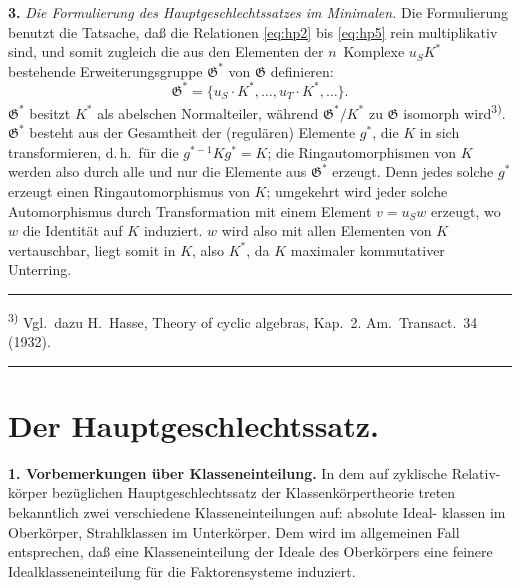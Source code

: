 \documentclass[12pt,a4paper]{article}
\theoremstyle{plain}
\newcommand{\Ga}{\mathfrak{G}}
\begin{document}
\medskip
\noindent\textbf{3.}\hspace{0.5em}%
\emph{Die Formulierung des Hauptgeschlechtssatzes im Minimalen.}\hspace{0.5em}%
Die Formulierung benutzt die Tatsache, da\ss{} die Relationen \eqref{eq:hp2} bis \eqref{eq:hp5} rein
multiplikativ sind, und somit zugleich die aus den Elementen der $n$~Komplexe
$u_S K^*$ bestehende Erweiterungsgruppe $\Ga^*$ von $\Ga$ definieren:
\begin{equation}\label{eq:hp6}
\Ga^* = \{u_S \cdot K^*, \ldots, u_T \cdot K^*, \ldots\}.
\end{equation}
$\Ga^*$ besitzt $K^*$ als abelschen Normalteiler, w\"ahrend $\Ga^*/K^*$ zu $\Ga$ isomorph
wird\textsuperscript{3)}. $\Ga^*$ besteht aus der Gesamtheit der (regul\"aren) Elemente $g^*$, die $K$
in sich transformieren, d.\,h.\ f\"ur die $g^{*-1} K g^* = K$; die Ringautomorphismen
von $K$ werden also durch alle und nur die Elemente aus $\Ga^*$ erzeugt. Denn
jedes solche $g^*$ erzeugt einen Ringautomorphismus von $K$; umgekehrt wird
jeder solche Automorphismus durch Transformation mit einem Element
$v = u_S w$ erzeugt, wo $w$ die Identit\"at auf $K$ induziert. $w$ wird also mit
allen Elementen von $K$ vertauschbar, liegt somit in $K$, also $K^*$, da $K$
maximaler kommutativer Unterring.

\bigskip
\noindent\rule{0.3\textwidth}{0.4pt}

{\small
\textsuperscript{3)} Vgl.\ dazu H.\ Hasse, Theory of cyclic algebras, Kap.~2. Am.\ Transact.\ 34 (1932).
}

\vspace{0.3cm}
\noindent\rule{\textwidth}{0.4pt}
\vspace{0.3cm}

\section{Der Hauptgeschlechtssatz.}
\label{sec:hauptsatz}

\medskip
\noindent\textbf{1. Vorbemerkungen \"uber Klasseneinteilung.}\hspace{0.5em}%
In dem auf zyklische Relativ-
k\"orper bez\"uglichen Hauptgeschlechtssatz der Klassenk\"orpertheorie treten
bekanntlich zwei verschiedene Klasseneinteilungen auf: absolute Ideal-
klassen im Oberk\"orper, Strahlklassen im Unterk\"orper. Dem wird im
allgemeinen Fall entsprechen, da\ss{} eine Klasseneinteilung der Ideale des
Oberk\"orpers eine feinere Idealklasseneinteilung f\"ur die Faktorensysteme
induziert.
\end{document}
